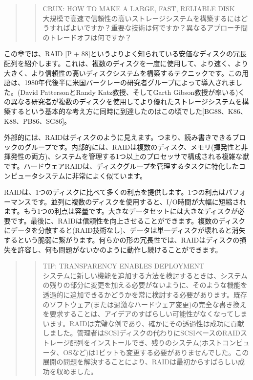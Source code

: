 \begin{quote}
\begin{quote}
CRUX: HOW TO MAKE A LARGE, FAST, RELIABLE DISK\\
大規模で高速で信頼性の高いストレージシステムを構築するにはどうすればよいですか？重要な技術は何ですか？異なるアプローチ間のトレードオフは何ですか？
\end{quote}
\end{quote}

この章では、RAID {[}P +
88{]}というよりよく知られている安価なディスクの冗長配列を紹介します。これは、複数のディスクを一度に使用して、より速く、より大きく、より信頼性の高いディスクシステムを構築するテクニックです。この用語は、1980年代後半に米国バークレーの研究者グループによって導入されました。(David
PattersonとRandy Katz教授、そしてGarth
Gibson教授が率いる)くの異なる研究者が複数のディスクを使用してより優れたストレージシステムを構築するという基本的な考え方に同時に到達したのはこの頃でした{[}BG88、K86、K88、PB86、SG86{]}。

外部的には、RAIDはディスクのように見えます。つまり、読み書きできるブロックのグループです。内部的には、RAIDは複数のディスク、メモリ(揮発性と非揮発性の両方)、システムを管理する1つ以上のプロセッサで構成される複雑な獣です。ハードウェアRAIDは、ディスクグループを管理するタスクに特化したコンピュータシステムに非常によく似ています。

RAIDは、1つのディスクに比べて多くの利点を提供します。1つの利点はパフォーマンスです。並列に複数のディスクを使用すると、I/O時間が大幅に短縮されます。もう1つの利点は容量です。大きなデータセットには大きなディスクが必要です。最後に、RAIDは信頼性を向上させることができます。複数のディスクにデータを分散すると(RAID技術なし)、データは単一ディスクが壊れると消失するという脆弱に繋がります。何らかの形の冗長性では、RAIDはディスクの損失を許容し、何も問題がないかのように動作し続けることができます。

\begin{quote}
\begin{quote}
TIP: TRANSPARENCY ENABLES DEPLOYMENT\\
システムに新しい機能を追加する方法を検討するときは、システムの残りの部分に変更を加える必要がないように、そのような機能を透過的に追加できるかどうかを常に検討する必要があります。既存のソフトウェア(または過激なハードウェア変更)の完全な書き換えを要求することは、アイデアのすばらしい可能性がなくなってしまいます。RAIDは完璧な例であり、確かにその透過性は成功に貢献しました。管理者はSCSIディスクの代わりにSCSIベースのRAIDストレージ配列をインストールでき、残りのシステム(ホストコンピュータ、OSなど)は1ビットも変更する必要がありませんでした。この展開の問題を解決することにより、RAIDは最初からすばらしい成功を収めました。
\end{quote}
\end{quote}


